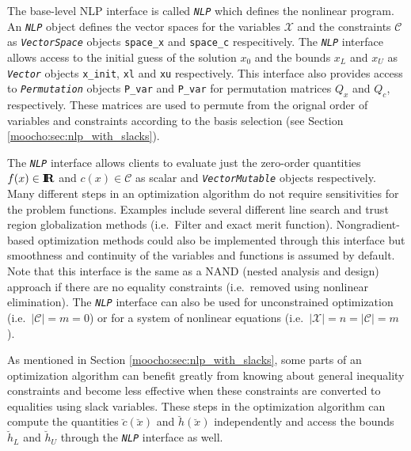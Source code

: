 \documentclass[pdf,ps2pdf,11pt]{SANDreport}
\begin{document}
The base-level NLP interface is called {}\texttt{\textit{NLP}} which defines
the nonlinear program.  An {}\texttt{\textit{NLP}} object defines the vector
spaces for the variables $\mathcal{X}$ and the constraints $\mathcal{C}$ as
{}\texttt{\textit{Vector\-Space}} objects {}\texttt{space\_x} and
{}\texttt{space\_c} respecitively.  The {}\texttt{\textit{NLP}} interface
allows access to the initial guess of the solution $x_0$ and the bounds $x_L$
and $x_U$ as {}\texttt{\textit{Vector}} objects {}\texttt{x\_init},
{}\texttt{xl} and {}\texttt{xu} respectively.  This interface also provides
access to {}\texttt{\textit{Permutation}} objects {}\texttt{P\_var} and
{}\texttt{P\_var} for permutation matrices $Q_x$ and $Q_c$, respectively.
These matrices are used to permute from the orignal order of variables and
constraints according to the basis selection (see Section
{}\ref{moocho:sec:nlp_with_slacks}).

The {}\texttt{\textit{NLP}} interface allows clients to evaluate just
the zero-order quantities $f(x) \in \mbox{\textbf{I}}\hspace{-0.6ex}\mbox{\textbf{R}}$ and $c(x) \in \mathcal{C}$ as
scalar and {}\texttt{\textit{Vector\-Mutable}} objects respectively.
Many different steps in an optimization algorithm do not require
sensitivities for the problem functions.  Examples include several
different line search and trust region globalization methods
(i.e.\ Filter and exact merit function).  Nongradient-based
optimization methods could also be implemented through this interface
but smoothness and continuity of the variables and functions is
assumed by default.  Note that this interface is the same as a NAND
(nested analysis and design) approach if there are no equality
constraints (i.e.\ removed using nonlinear elimination).  The
{}\texttt{\textit{NLP}} interface can also be used for unconstrained
optimization (i.e.\ $|\mathcal{C}| = m = 0$) or for a system of
nonlinear equations (i.e.\ $|\mathcal{X}| = n = |\mathcal{C}| = m$).

As mentioned in Section {}\ref{moocho:sec:nlp_with_slacks}, some parts of an
optimization algorithm can benefit greatly from knowing about general
inequality constraints and become less effective when these constraints are
converted to equalities using slack variables.  These steps in the
optimization algorithm can compute the quantities $\breve{c}(\breve{x})$ and
$\breve{h}(\breve{x})$ independently and access the bounds $\breve{h}_L$ and
$\breve{h}_U$ through the {}\texttt{\textit{NLP}} interface as well.
\end{document}
